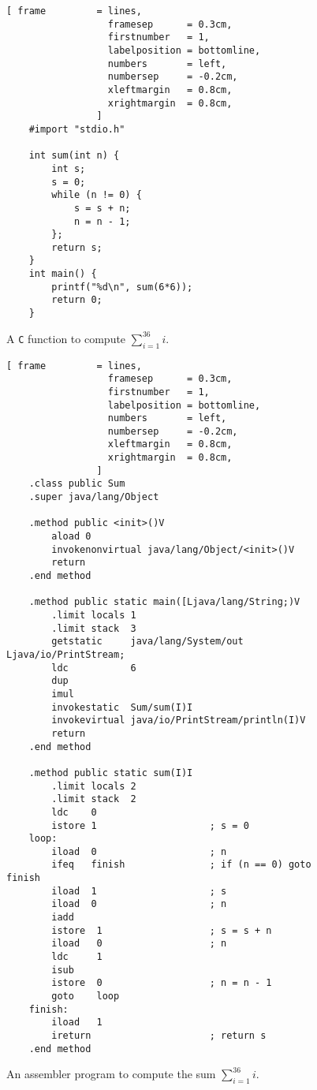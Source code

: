 \begin{figure}[!ht]
\centering
\begin{Verbatim}[ frame         = lines, 
                  framesep      = 0.3cm, 
                  firstnumber   = 1,
                  labelposition = bottomline,
                  numbers       = left,
                  numbersep     = -0.2cm,
                  xleftmargin   = 0.8cm,
                  xrightmargin  = 0.8cm,
                ]
    #import "stdio.h"
    
    int sum(int n) {
        int s;
        s = 0;
        while (n != 0) {
            s = s + n;
            n = n - 1;    
        };
        return s;
    }
    int main() {
        printf("%d\n", sum(6*6));
        return 0;
    }
\end{Verbatim}
\vspace*{-0.3cm}
\caption{A \texttt{C} function to compute  $\sum\limits_{i=1}^{36} i$.}
\label{fig:sum-jasmin.c}
\end{figure}

\begin{figure}[!ht]
\centering
\begin{Verbatim}[ frame         = lines, 
                  framesep      = 0.3cm, 
                  firstnumber   = 1,
                  labelposition = bottomline,
                  numbers       = left,
                  numbersep     = -0.2cm,
                  xleftmargin   = 0.8cm,
                  xrightmargin  = 0.8cm,
                ]
    .class public Sum
    .super java/lang/Object
    
    .method public <init>()V
        aload 0
        invokenonvirtual java/lang/Object/<init>()V
        return
    .end method
    
    .method public static main([Ljava/lang/String;)V
        .limit locals 1
        .limit stack  3
        getstatic     java/lang/System/out Ljava/io/PrintStream;
        ldc           6
        dup
        imul
        invokestatic  Sum/sum(I)I
        invokevirtual java/io/PrintStream/println(I)V
        return
    .end method
    
    .method public static sum(I)I
        .limit locals 2
        .limit stack  2
        ldc    0
        istore 1                    ; s = 0
    loop:
        iload  0                    ; n
        ifeq   finish               ; if (n == 0) goto finish
        iload  1                    ; s
        iload  0                    ; n
        iadd
        istore  1                   ; s = s + n
        iload   0                   ; n
        ldc     1
        isub
        istore  0                   ; n = n - 1
        goto    loop
    finish:
        iload   1
        ireturn                     ; return s
    .end method
\end{Verbatim}
\vspace*{-0.3cm}
\caption{An assembler program to compute the sum $\sum\limits_{i=1}^{36} i$.}
\label{fig:Sum.jas}
\end{figure}

